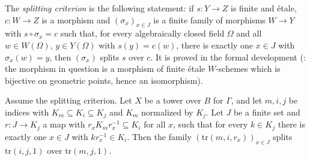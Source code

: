 The \emph{splitting criterion} is the following statement: if $s\colon Y\to Z$ is finite and \'etale,
$c\colon W\to Z$ is a morphism and $(\sigma_x)_{x\in J}$ is a finite family of morphisms $W\to Y$ with
$s\circ\sigma_x=c$ such that, for every algebraically closed field $\Omega$ and all $w\in W(\Omega)$,
$y\in Y(\Omega)$ with $s(y)=c(w)$, there is exactly one $x\in J$ with $\sigma_x(w)=y$, then
$(\sigma_x)$ splits $s$ over $c$. It is proved in the formal development
(: the morphism in question is a morphism of finite
\'etale $W$-schemes which is bijective on geometric points, hence an isomorphism).

\begin{lemma}\label{pf:ks2:twsplit}
Assume the splitting criterion. Let $X$ be a tower over $B$ for $\Gamma$, and let $m,i,j$ be indices
with $K_m\subseteq K_i\subseteq K_j$ and $K_m$ normalized by $K_j$. Let $J$ be a finite set and
$r\colon J\to K_j$ a map with $r_xK_mr_x^{-1}\subseteq K_i$ for all $x$, such that for every $k\in
K_j$ there is exactly one $x\in J$ with $kr_x^{-1}\in K_i$. Then the family
$(\mathrm{tr}(m,i,r_x))_{x\in J}$ splits $\mathrm{tr}(i,j,1)$ over $\mathrm{tr}(m,j,1)$.
\end{lemma}

